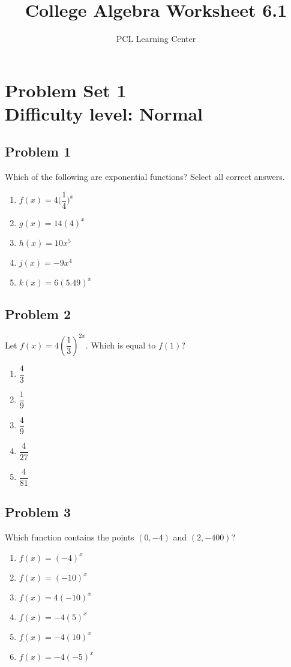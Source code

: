 \documentclass[12pt]{article}
\title{College Algebra Worksheet 6.1}
\author{PCL Learning Center}
\date{}
\begin{document}
\maketitle

\section*{Problem Set 1\\Difficulty level: Normal}

\subsection*{Problem 1}
Which of the following are exponential functions? Select all correct answers.
\begin{enumerate}[label=(\alph*)]
    \item \(f(x)=4\Big(\dfrac{1}{4}\Big)^x\)
    \item \(g(x)=14(4)^x\)
    \item \(h(x)=10x^5\)
    \item \(j(x)=-9x^4\)
    \item \(k(x)=6(5.49)^x\)
\end{enumerate}

\subsection*{Problem 2}
Let \( f(x) = 4\left(\dfrac{1}{3}\right)^{2x} \). Which is equal to \( f(1) \)?

\begin{enumerate}[label=(\alph*)]
    \item \( \dfrac{4}{3} \)
    \item \( \dfrac{1}{9} \)
    \item \( \dfrac{4}{9} \)
    \item \( \dfrac{4}{27} \)
    \item \( \dfrac{4}{81} \)
\end{enumerate}

\subsection*{Problem 3}
Which function contains the points \( (0, -4) \) and \( (2, -400) \)?

\begin{enumerate}[label=(\alph*)]
    \item \( f(x) = (-4)^x \)
    \item \( f(x) = (-10)^x \)
    \item \( f(x) = 4(-10)^x \)
    \item \( f(x) = -4(5)^x \)
    \item \( f(x) = -4(10)^x \)
    \item \( f(x) = -4(-5)^x \)
\end{enumerate}
\end{document}
